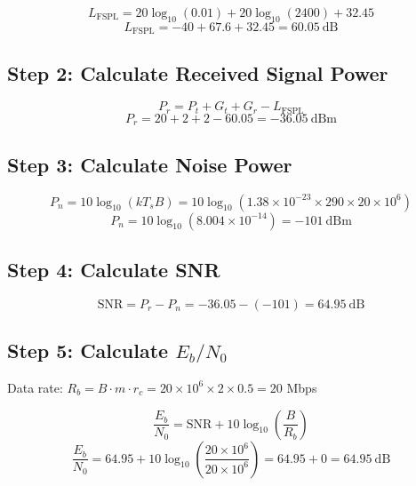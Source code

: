 \begin{equation}
L_{\mathrm{FSPL}} = 20\log_{10}(0.01) + 20\log_{10}(2400) + 32.45
\end{equation}
\begin{equation}
L_{\mathrm{FSPL}} = -40 + 67.6 + 32.45 = 60.05\ \text{dB}
\end{equation}

\subsection*{Step 2: Calculate Received Signal Power}

\begin{equation}
P_r = P_t + G_t + G_r - L_{\mathrm{FSPL}}
\end{equation}
\begin{equation}
P_r = 20 + 2 + 2 - 60.05 = -36.05\ \text{dBm}
\end{equation}

\subsection*{Step 3: Calculate Noise Power}

\begin{equation}
P_n = 10\log_{10}(kT_s B) = 10\log_{10}(1.38 \times 10^{-23} \times 290 \times 20 \times 10^6)
\end{equation}
\begin{equation}
P_n = 10\log_{10}(8.004 \times 10^{-14}) = -101\ \text{dBm}
\end{equation}

\subsection*{Step 4: Calculate SNR}

\begin{equation}
\mathrm{SNR} = P_r - P_n = -36.05 - (-101) = 64.95\ \text{dB}
\end{equation}

\subsection*{Step 5: Calculate $E_b/N_0$}

Data rate: $R_b = B \cdot m \cdot r_c = 20 \times 10^6 \times 2 \times 0.5 = 20$ Mbps

\begin{equation}
\frac{E_b}{N_0} = \mathrm{SNR} + 10\log_{10}\left(\frac{B}{R_b}\right)
\end{equation}
\begin{equation}
\frac{E_b}{N_0} = 64.95 + 10\log_{10}\left(\frac{20 \times 10^6}{20 \times 10^6}\right) = 64.95 + 0 = 64.95\ \text{dB}
\end{equation}

